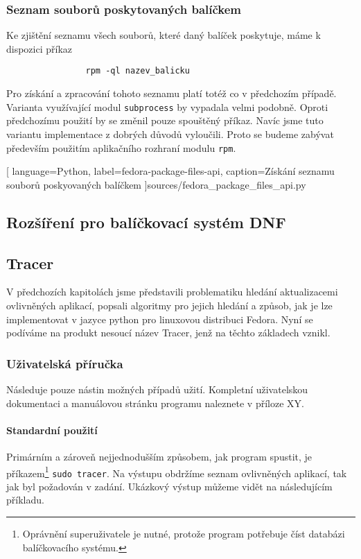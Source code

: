 \documentclass[10pt,a4paper]{article}
\begin{document}
			\subsubsection{Seznam souborů poskytovaných balíčkem}
			Ke zjištění seznamu všech souborů, které daný balíček poskytuje, máme k dispozici příkaz

			\begin{lstlisting}
				rpm -ql nazev_balicku
			\end{lstlisting}

			Pro získání a zpracování tohoto seznamu platí totéž co v předchozím případě. Varianta využívající modul \texttt{subprocess} by vypadala velmi podobně. Oproti předchozímu použití by se změnil pouze spouštěný příkaz. Navíc jsme tuto variantu implementace z dobrých důvodů vyloučili. Proto se budeme zabývat především použitím aplikačního rozhraní modulu \texttt{rpm}.

			
			[
				language=Python,
				label=fedora-package-files-api,
				caption={Získání seznamu souborů poskyovaných balíčkem}
			]{sources/fedora_package_files_api.py}

		\subsection{Rozšíření pro balíčkovací systém DNF}
		\subsection{Tracer}
			V předchozích kapitolách jsme představili problematiku hledání aktualizacemi ovlivněných aplikací, popsali algoritmy pro jejich hledání a způsob, jak je lze implementovat v jazyce python pro linuxovou distribuci Fedora. Nyní se podíváme na produkt nesoucí název Tracer, jenž na těchto základech vznikl.
			\subsubsection{Uživatelská příručka}
				Následuje pouze nástin možných případů užití. Kompletní uživatelskou dokumentaci a manuálovou stránku programu naleznete v příloze XY.

				\paragraph{Standardní použití}
				Primárním a zároveň nejjednodušším způsobem, jak program spustit, je příkazem\footnote{Oprávnění superuživatele je nutné, protože program potřebuje číst databázi balíčkovacího systému.} \texttt{sudo tracer}. Na výstupu obdržíme seznam ovlivněných aplikací, tak jak byl požadován v zadání. Ukázkový výstup můžeme vidět na následujícím příkladu.
\end{document}
